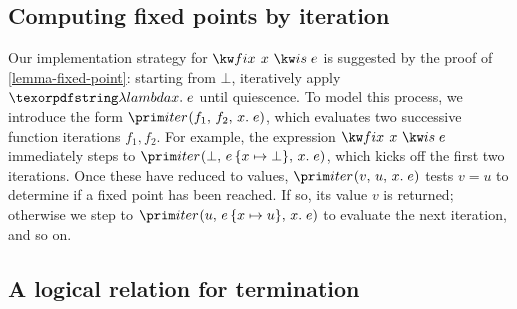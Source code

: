 \subsection{Computing fixed points by iteration}

Our implementation strategy for $\efixisraw{x}{e}$ is suggested by the proof of
\cref{lemma-fixed-point}: starting from $\bot$, iteratively apply $\fnof x e$
until quiescence. To model this process, we introduce the form
$\eiter{f_1}{f_2}{x}{e}$, which evaluates two successive function iterations
$f_1,f_2$.
%
For example, the expression $\efixisraw{x}{e}$ immediately steps to
$\eiter{\bot}{\subone{e}{x}{\bot}}{x}{e}$, which kicks off the first two
iterations.
%
Once these have reduced to values, $\eiter v u x e$ tests $v = u$ to determine
if a fixed point has been reached. If so, its value $v$ is returned; otherwise
we step to $\eiter{u}{\subone e x u}{x}{e}$ to evaluate the next iteration, and
so on.

\subsection{A logical relation for termination}

